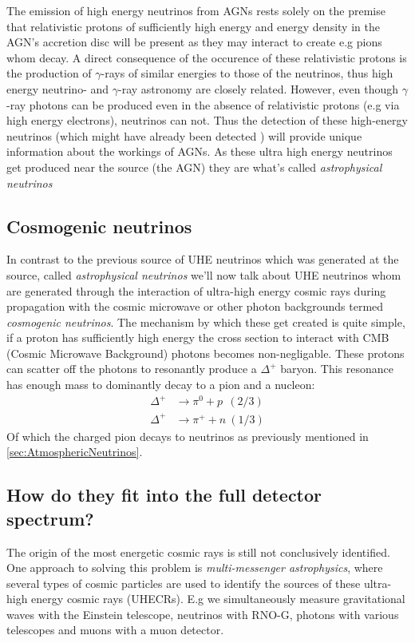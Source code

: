 \documentclass[11pt,a4paper,faculty=we,language=en,doctype=report]{cls/ugent-doc}
\begin{document}
The emission of high energy neutrinos from AGNs rests solely on the premise
that relativistic protons of sufficiently high energy and energy density in the
AGN's accretion disc will be present \cite{NASANeutrinos} as they may interact
to create e.g pions whom decay. A direct consequence of the occurence of these
relativistic protons is the production of $\gamma$-rays of similar energies to
those of the neutrinos, thus high energy neutrino- and $\gamma$-ray astronomy are
closely related.  However, even though $\gamma$-ray photons can be produced
even in the absence of relativistic protons (e.g via high energy electrons),
neutrinos can not.  Thus the detection of these high-energy neutrinos (which
might have already been detected \cite{AGNNeutrino}) will provide unique
information about the workings of AGNs.
As these ultra high energy neutrinos get produced near the source (the AGN)
they are what's called \textit{astrophysical neutrinos}

\subsection{Cosmogenic neutrinos}
In contrast to the previous source of UHE neutrinos which was generated at the
source, called \textit{astrophysical neutrinos} we'll now talk about UHE
neutrinos whom are generated through the interaction of ultra-high energy
cosmic rays during propagation with the cosmic microwave or other photon
backgrounds termed \textit{cosmogenic neutrinos}.  The mechanism by which these
get created is quite simple, if a proton has sufficiently high energy the cross
section to interact with CMB (Cosmic Microwave Background) photons becomes
non-negligable.  These protons can scatter off the photons to resonantly
produce a $\Delta^+$ baryon.  This resonance has enough mass to dominantly
decay to a pion and a nucleon:
\begin{align}
	\Delta^+ &\rightarrow \pi^0 + p \ \ (2/3)\\
	\Delta^+ &\rightarrow \pi^+ + n \ (1/3)
\end{align}
Of which the charged pion decays to neutrinos as previously mentioned in 
\ref{sec:AtmosphericNeutrinos}.
\subsection{How do they fit into the full detector spectrum?}
The origin of the most energetic cosmic rays is still not conclusively
identified. One approach to solving this problem is \textit{multi-messenger
astrophysics}, where several types of cosmic particles are used to identify the
sources of these ultra-high energy cosmic rays (UHECRs). E.g we simultaneously
measure gravitational waves with the Einstein telescope, neutrinos with RNO-G,
photons with various telescopes and muons with a muon detector.
\newpage
\end{document}

